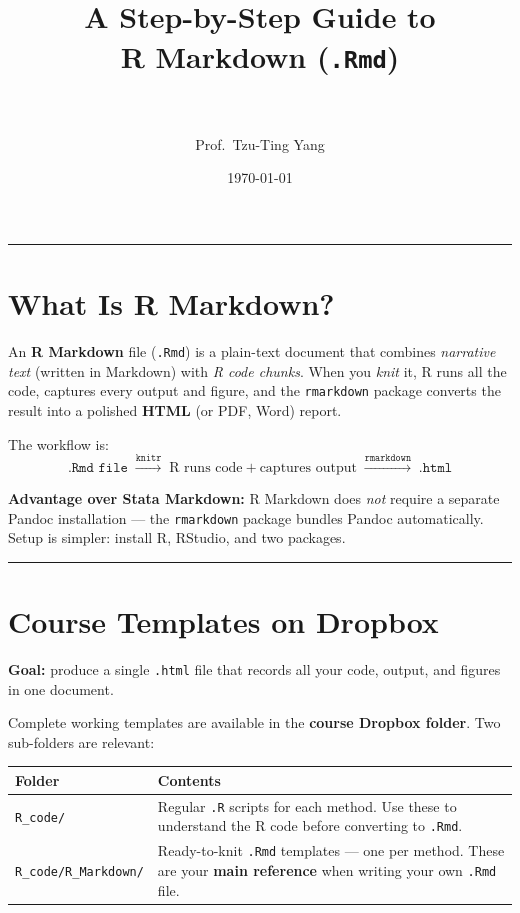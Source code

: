 \documentclass[paper=a4, fontsize=11pt]{scrartcl}
\title{
\normalfont \normalsize
\horrule{0.5pt} \\[0.4cm]
\huge A Step-by-Step Guide to \\[0.2cm] R Markdown (\texttt{.Rmd}) \\
\horrule{2pt} \\[0.5cm]
}
\author{Prof.\ Tzu-Ting Yang}
\date{\normalsize\today}
\newcommand{\horrule}[1]{\rule{\linewidth}{#1}}
\begin{document}
\maketitle

\tableofcontents
\bigskip\horrule{0.4pt}\bigskip

\section{What Is R Markdown?}

An \textbf{R Markdown} file (\texttt{.Rmd}) is a plain-text document that combines
\textit{narrative text} (written in Markdown) with \textit{R code chunks}.
When you \textit{knit} it, R runs all the code, captures every output and figure,
and the \texttt{rmarkdown} package converts the result into a polished
\textbf{HTML} (or PDF, Word) report.

\medskip
The workflow is:
\[
\texttt{.Rmd file}
\;\xrightarrow{\texttt{knitr}}\;
\text{R runs code} + \text{captures output}
\;\xrightarrow{\texttt{rmarkdown}}\;
\texttt{.html}
\]

\begin{tipbox}
\textbf{Advantage over Stata Markdown:} R Markdown does \textit{not} require a
separate Pandoc installation --- the \texttt{rmarkdown} package bundles Pandoc
automatically. Setup is simpler: install R, RStudio, and two packages.
\end{tipbox}

\bigskip\horrule{0.4pt}\bigskip

\section{Course Templates on Dropbox}

\textbf{Goal:} produce a single \texttt{.html} file that records all your
code, output, and figures in one document.

\medskip
Complete working templates are available in the \textbf{course Dropbox folder}.
Two sub-folders are relevant:

\medskip
\begin{center}
\begin{tabular}{p{4.5cm} p{9.5cm}}
\toprule
\textbf{Folder} & \textbf{Contents} \\
\midrule
\texttt{R\_code/} &
Regular \texttt{.R} scripts for each method.
Use these to understand the R code before converting to \texttt{.Rmd}. \\[4pt]
\texttt{R\_code/R\_Markdown/} &
Ready-to-knit \texttt{.Rmd} templates --- one per method.
These are your \textbf{main reference} when writing your own \texttt{.Rmd} file. \\
\bottomrule
\end{tabular}
\end{center}
\end{document}
